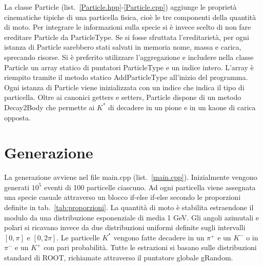 \documentclass[a4paper,10pt]{article}
\begin{document}
La classe Particle (list.~\ref{Particle.hpp}-\ref{Particle.cpp}) aggiunge le proprietà cinematiche tipiche di una particella fisica, cioè le tre componenti della quantità di moto. Per integrare le informazioni sulla specie si è invece scelto di non fare ereditare Particle da ParticleType. Se si fosse sfruttata l'ereditarietà, per ogni istanza di Particle sarebbero stati salvati in memoria nome, massa e carica, sprecando risorse. Si è preferito utilizzare l'aggregazione e includere nella classe Particle un array statico di puntatori ParticleType e un indice intero. L'array è riempito tramite il metodo statico AddParticleType all'inizio del programma. Ogni istanza di Particle viene inizializzata con un indice che indica il tipo di particella. Oltre ai canonici getters e setters, Particle dispone di un metodo Decay2Body che permette ai $K^*$ di decadere in un pione e in un kaone di carica opposta.

\section{Generazione}
La generazione avviene nel file main.cpp (list.~\ref{main.cpp}). Inizialmente vengono generati $10^5$ eventi di 100 particelle ciascuno. Ad ogni particella viene assegnata una specie casuale attraverso un blocco if-else if-else secondo le proporzioni definite in tab.~\ref{tab:proporzioni}. La quantità di moto è stabilita estraendone il modulo da una distribuzione esponenziale di media 1 GeV. Gli angoli azimutali e polari si ricavano invece da due distribuzioni uniformi definite sugli intervalli $[0,\pi]$ e $[0,2\pi]$. Le particelle $K^*$ vengono fatte decadere in un $\pi^+$ e un $K^-$ o in $\pi^-$ e un $K^+$ con pari probabilità. Tutte le estrazioni si basano sulle distribuzioni standard di ROOT, richiamate attraverso il puntatore globale gRandom.
\end{document}
